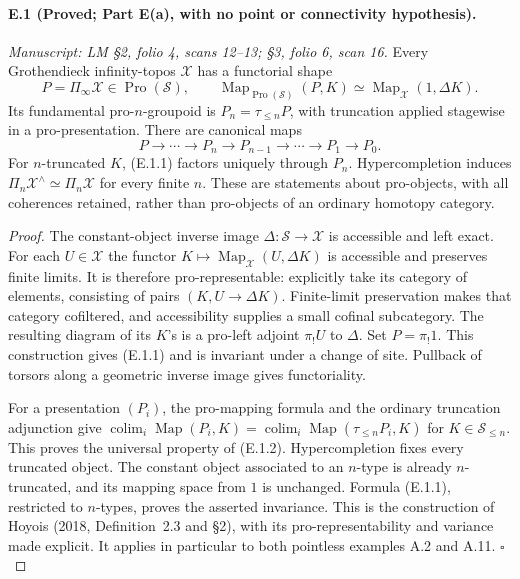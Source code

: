 \paragraph{E.1 (Proved; Part E(a), with no point or connectivity hypothesis).}
\textit{Manuscript: LM \S2, folio 4, scans 12--13; \S3, folio 6, scan 16.}
Every Grothendieck infinity-topos $\mathcal X$ has a functorial shape
\[
 P=\Pi_\infty\mathcal X\in\operatorname{Pro}(\mathcal S),\qquad
 \operatorname{Map}_{\operatorname{Pro}(\mathcal S)}(P,K)
       \simeq\operatorname{Map}_{\mathcal X}(1,\Delta K).
                                                        \tag{E.1.1}
\]
Its fundamental pro-$n$-groupoid is $P_n=\tau_{\le n}P$, with truncation applied stagewise in a pro-presentation. There are canonical maps
\[
 P\longrightarrow\cdots\longrightarrow P_n\longrightarrow P_{n-1}
                 \longrightarrow\cdots\longrightarrow P_1\longrightarrow P_0.
                                                        \tag{E.1.2}
\]
For $n$-truncated $K$, (E.1.1) factors uniquely through $P_n$. Hypercompletion induces $\Pi_n\mathcal X^\wedge\simeq\Pi_n\mathcal X$ for every finite $n$. These are statements about pro-objects, with all coherences retained, rather than pro-objects of an ordinary homotopy category.
\begin{proof}
The constant-object inverse image $\Delta:\mathcal S\to\mathcal X$ is accessible and left exact. For each $U\in\mathcal X$ the functor $K\mapsto\operatorname{Map}_{\mathcal X}(U,\Delta K)$ is accessible and preserves finite limits. It is therefore pro-representable: explicitly take its category of elements, consisting of pairs $(K,U\to\Delta K)$. Finite-limit preservation makes that category cofiltered, and accessibility supplies a small cofinal subcategory. The resulting diagram of its $K$'s is a pro-left adjoint $\pi_!U$ to $\Delta$. Set $P=\pi_!1$. This construction gives (E.1.1) and is invariant under a change of site. Pullback of torsors along a geometric inverse image gives functoriality.

For a presentation $(P_i)$, the pro-mapping formula and the ordinary truncation adjunction give
$\operatorname{colim}_i\operatorname{Map}(P_i,K)
 =\operatorname{colim}_i\operatorname{Map}(\tau_{\le n}P_i,K)$
for $K\in\mathcal S_{\le n}$. This proves the universal property of (E.1.2). Hypercompletion fixes every truncated object. The constant object associated to an $n$-type is already $n$-truncated, and its mapping space from $1$ is unchanged. Formula (E.1.1), restricted to $n$-types, proves the asserted invariance. This is the construction of Hoyois (2018, Definition~2.3 and \S2), with its pro-representability and variance made explicit. It applies in particular to both pointless examples A.2 and A.11. \hfill$\square$
\end{proof}

